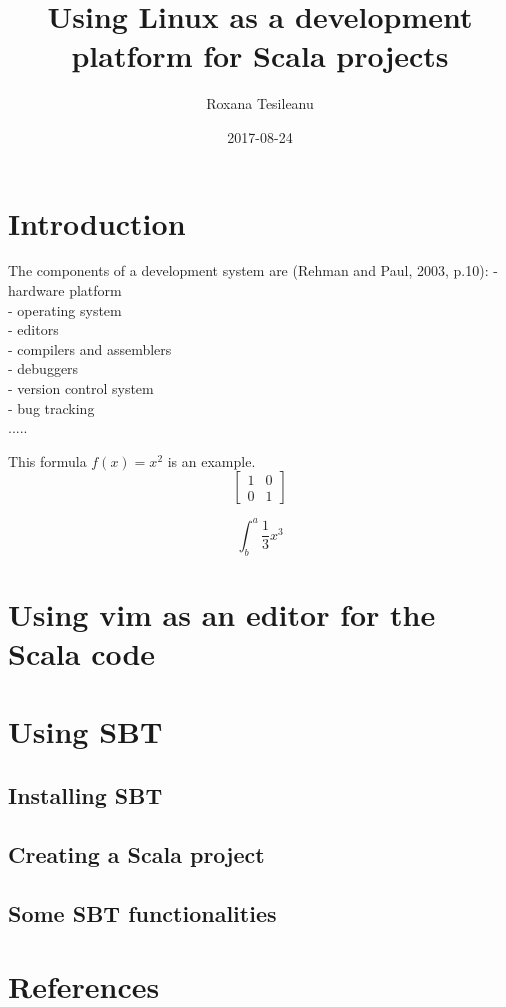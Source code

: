 \documentclass{article}
\title{Using Linux as a development platform for Scala projects}
\date{2017-08-24}
\author{Roxana Tesileanu}
\begin{document}
	\maketitle
	\newpage

\section{Introduction}
The components of a development system are (Rehman and Paul, 2003, p.10):\newline
- hardware platform \\
- operating system \\
- editors \\
- compilers and assemblers \\
- debuggers \\
- version control system \\
- bug tracking \\

.....

This formula $f(x) = x^2$ is an example.
\begin{equation}
\left[
\begin{matrix}
1 & 0 \\
0 & 1
\end{matrix}
\right]
\end{equation}

\begin{equation}
\int^a_b\frac{1}{3}x^3
\end{equation}

\section{Using vim as an editor for the Scala code}
\section{Using SBT}
\subsection{Installing SBT}
\subsection{Creating a Scala project}
\subsection{Some SBT functionalities}
\section{References}

  
\end{document}
